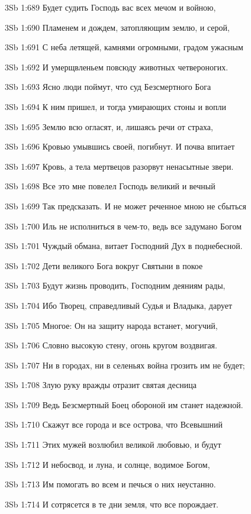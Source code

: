\vs 3Sb 1:689 Будет судить Господь вас всех мечом и войною,

\vs 3Sb 1:690 Пламенем и дождем, затопляющим землю, и серой, 

\vs 3Sb 1:691 С неба летящей, камнями огромными, градом ужасным 

\vs 3Sb 1:692 И умерщвленьем повсюду животных четвероногих. 

\vs 3Sb 1:693 Ясно люди поймут, что суд Безсмертного Бога 

\vs 3Sb 1:694 К ним пришел, и тогда умирающих стоны и вопли

\vs 3Sb 1:695 Землю всю огласят, и, лишаясь речи от страха,

\vs 3Sb 1:696 Кровью умывшись своей, погибнут. И почва впитает 

\vs 3Sb 1:697 Кровь, а тела мертвецов разорвут ненасытные звери.

\vs 3Sb 1:698 Все это мне повелел Господь великий и вечный 

\vs 3Sb 1:699 Так предсказать. И не может реченное мною не сбыться 

\vs 3Sb 1:700 Иль не исполниться в чем-то, ведь все задумано Богом  

\vs 3Sb 1:701 Чуждый обмана, витает Господний Дух в поднебесной.

\vs 3Sb 1:702 Дети великого Бога вокруг Святыни в покое 

\vs 3Sb 1:703 Будут жизнь проводить, Господним деяниям рады, 

\vs 3Sb 1:704 Ибо Творец, справедливый Судья и Владыка, дарует

\vs 3Sb 1:705 Многое: Он на защиту народа встанет, могучий, 

\vs 3Sb 1:706 Словно высокую стену, огонь кругом воздвигая. 

\vs 3Sb 1:707 Ни в городах, ни в селеньях война грозить им не будет; 

\vs 3Sb 1:708 Злую руку вражды отразит святая десница  

\vs 3Sb 1:709 Ведь Безсмертный Боец обороной им станет надежной.

\vs 3Sb 1:710 Скажут все города и все острова, что Всевышний 

\vs 3Sb 1:711 Этих мужей возлюбил великой любовью, и будут 

\vs 3Sb 1:712 И небосвод, и луна, и солнце, водимое Богом, 

\vs 3Sb 1:713 Им помогать во всем и печься о них неустанно. 

\vs 3Sb 1:714 И сотрясется в те дни земля, что все порождает.

